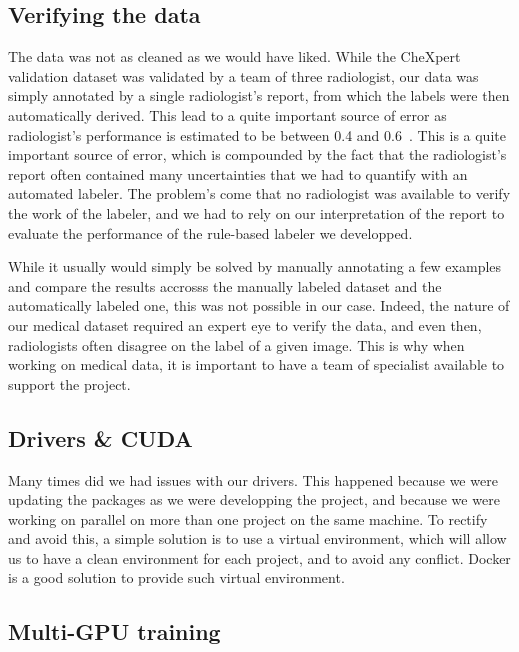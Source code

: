 \documentclass[11pt]{article}
\begin{document}
    \subsection{Verifying the data}
            The data was not as cleaned as we would have liked. While the CheXpert validation dataset was validated by a team of three radiologist, our data
            was simply annotated by a single radiologist's report, from which the labels were then automatically derived. This lead to a quite important source of error as radiologist's performance
            is estimated to be between 0.4 and 0.6~\cite{radiologist_performance}. This is a quite important source of error, which is compounded
            by the fact that the radiologist's report often contained many uncertainties that we had
            to quantify with an automated labeler. The problem's come that no radiologist was available to verify the work of the labeler, and we had to rely on our interpretation of
            the report to evaluate the performance of the rule-based labeler we developped.

            While it usually would simply be solved by manually annotating a few examples and compare the results accrosss the manually labeled dataset
            and the automatically labeled one, this was not possible in our case. Indeed, the nature of our medical dataset required an expert eye to verify the data,
            and even then, radiologists often disagree on the label of a given image. This is why when working on medical data, it is important to have a team of specialist available to support the project.


    \subsection{Drivers \& CUDA}

        Many times did we had issues with our drivers. This happened because we were updating the packages as we were developping the project, and because we were working on parallel on more than one project
        on the same machine. To rectify and avoid this, a simple solution is to use a virtual environment, which will allow us to have a clean environment for each project, and to avoid any conflict. Docker
        is a good solution to provide such virtual environment.

    \subsection{Multi-GPU training}
\end{document}
